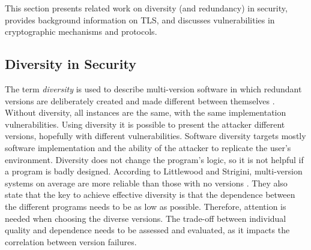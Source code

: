 \documentclass{sig-alternate-05-2015}
\begin{document}

This section presents related work on diversity (and redundancy) in security, provides background information on TLS, and discusses vulnerabilities in cryptographic mechanisms and protocols.

\subsection{Diversity in Security}

The term \textit{diversity} is used to describe multi-version software in which redundant versions are deliberately created and made different between themselves \cite{Littlewood2004}.
Without diversity, all instances are the same, with the same implementation vulnerabilities. Using diversity it is possible to present the attacker different versions, hopefully with different vulnerabilities. %
%
Software diversity targets mostly software implementation and the ability of the attacker to replicate the user's environment. 
Diversity does not change the program's logic, so it is not  helpful if a program is badly designed.
%
According to Littlewood and Strigini, multi-version systems on average are more reliable than those with no versions \cite{Littlewood2004}. They  also state that the key to achieve effective diversity is that the dependence between the different programs needs to be as low as possible. %
%
Therefore, attention is needed when choosing the diverse versions. The trade-off between individual quality and  dependence needs to be assessed and evaluated, as it impacts the correlation between version failures.


\end{document}
